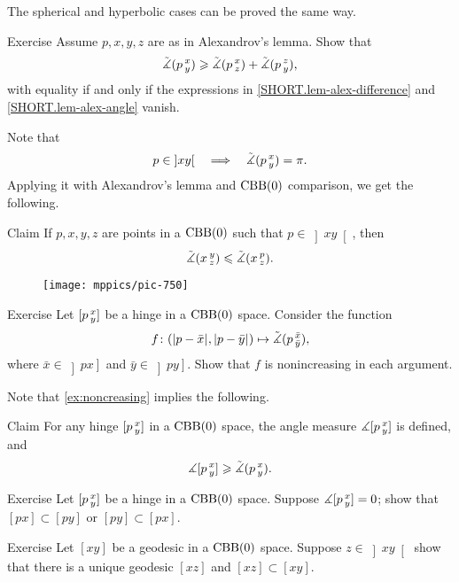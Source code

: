 The spherical and hyperbolic cases can be proved the same way.
\qeds

\begin{thm}{Exercise}\label{ex:alex-lemma-cat}
Assume $p,x,y,z$ are as in Alexandrov's lemma.
Show that
\[\tilde\measuredangle(p\,{}^{x}_{y})
\geqslant
\tilde\measuredangle(p\,{}^{x}_{z}) + \tilde\measuredangle(p\,{}^{z}_{y}),\]
with equality if and only if the expressions in \ref{SHORT.lem-alex-difference} and \ref{SHORT.lem-alex-angle} vanish.
\end{thm}

Note that 
\[p\in\left]x y\right[
\quad\Longrightarrow\quad
\tilde\measuredangle(p\,{}^{x}_{y})=\pi.
\]
Applying it with Alexandrov's lemma and $\mathrm{CBB}(0)$ comparison, we get the following.

\begin{thm}{Claim}\label{clm:angle-mono}
If $p,x,y,z$ are points in a $\mathrm{CBB}(0)$ such that $p\in\left]x y\right[$, then 
\[\tilde\measuredangle(x\,{}^{y}_{z})\leqslant \tilde\measuredangle(x\,{}^{p}_{z}).\]
\end{thm}

\begin{wrapfigure}{r}{25mm}
\vskip-0mm
\centering
\texttt{[image: mppics/pic-750]}
\end{wrapfigure}

\begin{thm}{Exercise}\label{ex:noncreasing}
Let $[p\,{}^{x}_{y}]$ be a hinge in a $\mathrm{CBB}(0)$ space.
Consider the function
\[f\:(\dist{p}{\bar x}{},\dist{p}{\bar y}{})\mapsto \angk p{\bar x}{\bar y},\]
where $\bar x\in\left]p x\right]$ and $\bar y\in\left]p y\right]$.
Show that $f$ is nonincreasing in each argument.
\end{thm}

Note that \ref{ex:noncreasing} implies the following.

\begin{thm}{Claim}\label{clm:angle-defined}
For any hinge $[p\,{}^{x}_{y}]$ in a $\mathrm{CBB}(0)$ space,
the angle measure $\measuredangle[p\,{}^{x}_{y}]$ is defined, and
\[\measuredangle[p\,{}^{x}_{y}]\geqslant \tilde\measuredangle(p\,{}^{x}_{y}).\]

\end{thm}

\begin{thm}{Exercise}\label{ex:0-angle}
Let $[p\,{}^{x}_{y}]$ be a hinge in a $\mathrm{CBB}(0)$ space.
Suppose $\measuredangle[p\,{}^{x}_{y}]=0$; show that $[px]\subset [py]$ or $[py]\subset [px]$.
\end{thm}

\begin{thm}{Exercise}\label{ex:pi-angle}
Let $[xy]$ be a geodesic in a $\mathrm{CBB}(0)$ space.
Suppose $z\in \left]xy\right[$ show that there is a unique geodesic $[xz]$ and $[xz]\subset [xy]$.
\end{thm}

